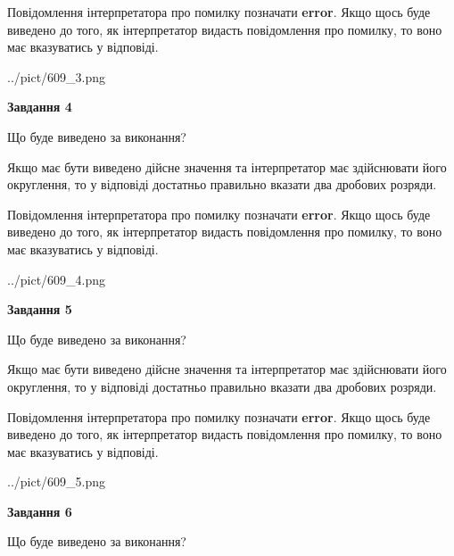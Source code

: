 \documentclass[12pt, ukrainian]{article}
\begin{document}
{\begin {Large}
Повідомлення інтерпретатора про помилку позначати \textbf{error}.
Якщо щось буде виведено до того, як інтерпретатор видасть повідомлення про помилку, 
то воно має вказуватись у відповіді. \par

\begin{center}
	{../pict/609_3.png}
\end{center}
\newpage

{\begin {center}\textbf{Завдання 4}\end {center}}\par
Що буде виведено за виконання? \par

Якщо має бути виведено дійсне значення та інтерпретатор має здійснювати його округлення, 
то у відповіді достатньо правильно вказати два дробових розряди.

Повідомлення інтерпретатора про помилку позначати \textbf{error}.
Якщо щось буде виведено до того, як інтерпретатор видасть повідомлення про помилку, 
то воно має вказуватись у відповіді. \par

\begin{center}
	{../pict/609_4.png}
\end{center}
\newpage

{\begin {center}\textbf{Завдання 5}\end {center}}\par
Що буде виведено за виконання? \par

Якщо має бути виведено дійсне значення та інтерпретатор має здійснювати його округлення, 
то у відповіді достатньо правильно вказати два дробових розряди.

Повідомлення інтерпретатора про помилку позначати \textbf{error}.
Якщо щось буде виведено до того, як інтерпретатор видасть повідомлення про помилку, 
то воно має вказуватись у відповіді. \par

\begin{center}
	{../pict/609_5.png}
\end{center}
\newpage

{\begin {center}\textbf{Завдання 6}\end {center}}\par
Що буде виведено за виконання? \par


\end{Large}}
\end{document}
